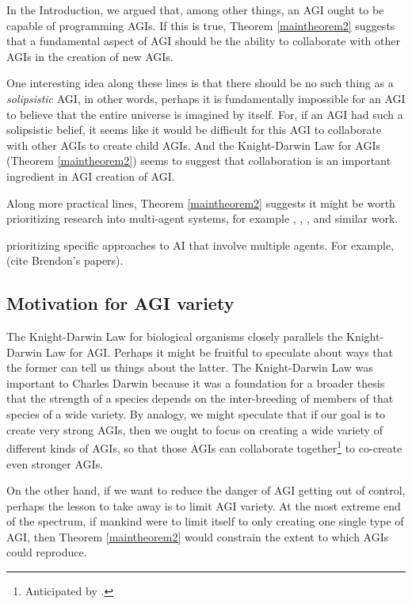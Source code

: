 \documentclass[runningheads]{llncs}
\begin{document}
In the Introduction, we argued that, among other things, an AGI ought to be
capable of programming AGIs. If this is true, Theorem \ref{maintheorem2} suggests
that a fundamental aspect of AGI should be the ability to collaborate with other
AGIs in the creation of new AGIs.

One interesting idea along these lines is that there should be no
such thing as a \emph{solipsistic} AGI, in other words, perhaps it is
fundamentally impossible for an AGI to believe that the entire universe
is imagined by itself. For, if an AGI had such a solipsistic belief, it
seems like it would be difficult for this AGI to collaborate with other AGIs
to create child AGIs. And the Knight-Darwin Law for AGIs (Theorem \ref{maintheorem2})
seems to suggest that collaboration is an important ingredient in AGI creation of AGI.

Along more practical lines, Theorem \ref{maintheorem2} suggests it might be worth
prioritizing research into multi-agent systems, for example
\cite{hibbard2011societies}, \cite{lazaridou2018emergence},
\cite{bansal2017emergent}, and similar work.

prioritizing specific approaches to AI that involve multiple agents. For example,
(cite Brendon's papers).

\subsection{Motivation for AGI variety}

The Knight-Darwin Law for biological organisms closely parallels the Knight-Darwin
Law for AGI. Perhaps it might be fruitful to speculate about ways that the former
can tell us things about the latter. The Knight-Darwin Law was important to Charles
Darwin because it was a foundation for a broader thesis that the strength of a
species depends on the inter-breeding of members of that species of a wide variety.
By analogy, we might speculate that if our goal is to create very strong AGIs, then
we ought to focus on creating a wide variety of different kinds of AGIs, so that
those AGIs can collaborate together\footnote{Anticipated
by \cite{dai2011artificial}.} to co-create even stronger AGIs.

On the other hand, if we want to reduce the danger of AGI getting out of control,
perhaps the lesson to take away is to limit AGI variety. At the most extreme end
of the spectrum, if mankind were to limit itself to only creating one single
type of AGI, then Theorem \ref{maintheorem2} would constrain the extent to which
AGIs could reproduce.
\end{document}
